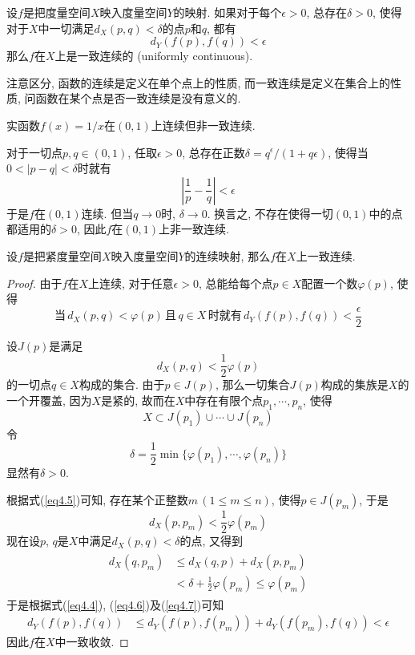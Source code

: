 \documentclass[cn,12pt,math=mtpro2,citestyle=gb7714-2015,bibstyle=gb7714-2015,twocol]{elegantbook}
\begin{document}
\begin{definition}
设$f$是把度量空间$X$映入度量空间$Y$的映射. 如果对于每个$\epsilon>0$, 总存在$\delta>0$, 使得对于$X$中一切满足$d_X(p,q)<\delta$的点$p$和$q$, 都有
$$d_Y(f(p),f(q))<\epsilon$$
那么$f$在$X$上是一致连续的 (uniformly continuous).
\end{definition}
注意区分, 函数的连续是定义在单个点上的性质, 而一致连续是定义在集合上的性质, 问函数在某个点是否一致连续是没有意义的.
\begin{example}
实函数$\displaystyle f(x)=1/x$在$(0,1)$上连续但非一致连续.

对于一切点$p, q\in (0,1)$, 任取$\epsilon>0$, 总存在正数$\delta=q^\epsilon/(1+q\epsilon)$, 使得当$0<|p-q|<\delta$时就有
$$\left|\frac{1}{p}-\frac{1}{q}\right|<\epsilon$$
于是$f$在$(0,1)$连续. 但当$q\rightarrow0$时, $\delta\rightarrow0$. 换言之, 不存在使得一切$(0,1)$中的点都适用的$\delta>0$, 因此$f$在$(0,1)$上非一致连续.
\end{example}
\begin{theorem}\label{thm:th4.12}
  设$f$是把紧度量空间$X$映入度量空间$Y$的连续映射, 那么$f$在$X$上一致连续.
\end{theorem}
\begin{proof}
  由于$f$在$X$上连续, 对于任意$\epsilon>0$, 总能给每个点$p\in X$配置一个数$\varphi(p)$, 使得
 \begin{equation}\label{eq4.4}
    \text{当}\,d_X(p,q)<\varphi(p)\,\text{且}\,q\in X\,\text{时就有}\,d_Y(f(p),f(q))<\frac{\epsilon}{2}
 \end{equation}

  设$J(p)$是满足
  $$d_X(p,q)<\frac{1}{2}\varphi(p)$$
  的一切点$q\in X$构成的集合. 由于$p\in J(p)$, 那么一切集合$J(p)$构成的集族是$X$的一个开覆盖, 因为$X$是紧的, 故而在$X$中存在有限个点$p_1, \cdots, p_n$, 使得
  \begin{equation}\label{eq4.5}
    X\subset J(p_1)\cup\cdots\cup J(p_n)
  \end{equation}
  令
  $$\delta=\frac{1}{2}\min\{\varphi(p_1),\cdots,\varphi(p_n)\}$$
  显然有$\delta>0$.

 根据式(\ref{eq4.5})可知, 存在某个正整数$m\,(1\leq m\leq n)$, 使得$p\in J(p_m)$, 于是
 \begin{equation}\label{eq4.6}
   d_X(p,p_m)<\frac{1}{2}\varphi(p_m)
 \end{equation}
 现在设$p$, $q$是$X$中满足$d_X(p,q)<\delta$的点, 又得到
 \begin{align}\label{eq4.7}
 \begin{split}
   d_X(q,p_m)&\leq d_X(q,p)+d_X(p,p_m) \\
   &<\delta+\frac{1}{2}\varphi(p_m)\leq\varphi(p_m)
   \end{split}
 \end{align}
 于是根据式(\ref{eq4.4}), (\ref{eq4.6})及(\ref{eq4.7})可知
\begin{align*}
d_Y(f(p),f(q))&\leq d_Y(f(p),f(p_m))+d_Y(f(p_m),f(q)) <\epsilon
\end{align*}
 因此$f$在$X$中一致收敛.

\end{proof}
\end{document}
